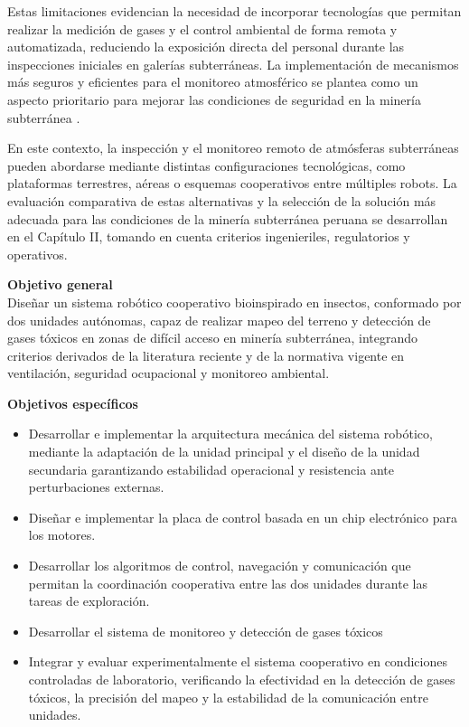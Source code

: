 Estas limitaciones evidencian la necesidad de incorporar tecnologías que permitan realizar la medición de gases y el control ambiental de forma remota y automatizada, reduciendo la exposición directa del personal durante las inspecciones iniciales en galerías subterráneas. La implementación de mecanismos más seguros y eficientes para el monitoreo atmosférico se plantea como un aspecto prioritario para mejorar las condiciones de seguridad en la minería subterránea \cite{OSINERGMIN_BoletinGSM_2020, MINEM_DS024_2016}.

En este contexto, la inspección y el monitoreo remoto de atmósferas subterráneas pueden abordarse mediante distintas configuraciones tecnológicas, como plataformas terrestres, aéreas o esquemas cooperativos entre múltiples robots. La evaluación comparativa de estas alternativas y la selección de la solución más adecuada para las condiciones de la minería subterránea peruana se desarrollan en el Capítulo II, tomando en cuenta criterios ingenieriles, regulatorios y operativos.




\textbf{Objetivo general} \\
Diseñar un sistema robótico cooperativo bioinspirado en insectos, conformado por dos unidades autónomas, capaz de realizar mapeo del terreno y detección de gases tóxicos en zonas de difícil acceso en minería subterránea, integrando criterios derivados de la literatura reciente y de la normativa vigente en ventilación, seguridad ocupacional y monitoreo ambiental.


\textbf{Objetivos específicos}
\begin{itemize}
    \item Desarrollar e implementar la arquitectura mecánica del sistema robótico, mediante la adaptación de la unidad principal y el diseño de la unidad secundaria garantizando estabilidad operacional y resistencia ante perturbaciones externas.
    \item Diseñar e implementar la placa de control basada en un chip electrónico para los motores.
    \item Desarrollar los algoritmos de control, navegación y comunicación que permitan la coordinación cooperativa entre las dos unidades durante las tareas de exploración.
    \item Desarrollar el sistema de monitoreo y detección de gases tóxicos
    \item Integrar y evaluar experimentalmente el sistema cooperativo en condiciones controladas de laboratorio, verificando la efectividad en la detección de gases tóxicos, la precisión del mapeo y la estabilidad de la comunicación entre unidades.
\end{itemize}


